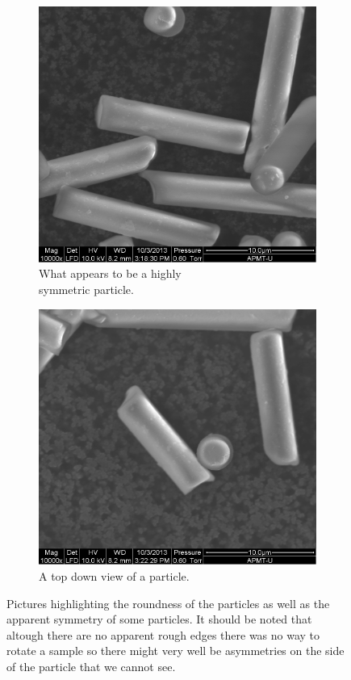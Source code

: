 \begin{figure}[H]
\centering
\begin{subfigure}[3a]{0.40\textwidth}
\includegraphics[width=\textwidth]{figures/method/symmetric.png}
\caption{What appears to be a highly \\ symmetric particle.}\label{fig:symmetricparticle}
\end{subfigure}\hspace{1em}%
\begin{subfigure}[3b]{0.40\textwidth}
\includegraphics[width=\textwidth]{figures/method/round.png}
\caption{A top down view of a particle.}\label{fig:roundparticle}
\end{subfigure}
\caption{Pictures highlighting the roundness of the particles as well as the apparent symmetry of some particles. It should be noted that altough there are no apparent rough edges there was no way to rotate a sample so there might very well be asymmetries on the side of the particle that we cannot see.}
\label{fig:particlepictures2}
\end{figure}

